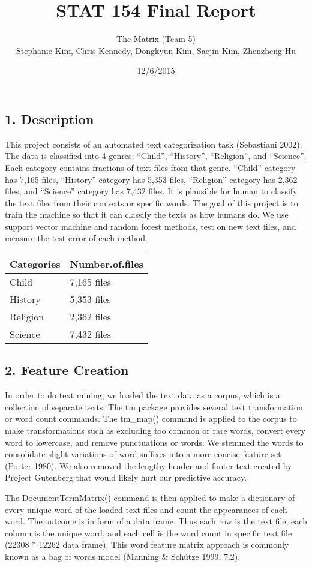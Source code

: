 \documentclass[]{article}
\title{STAT 154 Final Report}
\author{The Matrix (Team 5)\\Stephanie Kim, Chris Kennedy, Dongkyun Kim, Saejin
Kim, Zhenzheng Hu}
\date{12/6/2015}
\begin{document}
\maketitle


\subsection{{1. Description}}\label{description}

This project consists of an automated text categorization task
(Sebastiani 2002). The data is classified into 4 genres; ``Child'',
``History'', ``Religion'', and ``Science''. Each category contains
fractions of text files from that genre. ``Child'' category has 7,165
files, ``History'' category has 5,353 files, ``Religion'' category has
2,362 files, and ``Science'' category has 7,432 files. It is plausible
for human to classify the text files from their contexts or specific
words. The goal of this project is to train the machine so that it can
classify the texts as how humans do. We use support vector machine and
random forest methods, test on new text files, and measure the test
error of each method.

\begin{longtable}[c]{@{}ll@{}}
\toprule
Categories & Number.of.files\tabularnewline
\midrule
\endhead
Child & 7,165 files\tabularnewline
History & 5,353 files\tabularnewline
Religion & 2,362 files\tabularnewline
Science & 7,432 files\tabularnewline
\bottomrule
\end{longtable}

\subsection{{2. Feature Creation}}\label{feature-creation}

In order to do text mining, we loaded the text data as a corpus, which
is a collection of separate texts. The tm package provides several text
transformation or word count commands. The tm\_map() command is applied
to the corpus to make transformations such as excluding too common or
rare words, convert every word to lowercase, and remove punctuations or
words. We stemmed the words to consolidate slight variations of word
suffixes into a more concise feature set (Porter 1980). We also removed
the lengthy header and footer text created by Project Gutenberg that
would likely hurt our predictive accuracy.

The DocumentTermMatrix() command is then applied to make a dictionary of
every unique word of the loaded text files and count the appearances of
each word. The outcome is in form of a data frame. Thus each row is the
text file, each column is the unique word, and each cell is the word
count in specific text file (22308 * 12262 data frame). This word
feature matrix approach is commonly known as a bag of words model
(Manning \& Schütze 1999, 7.2).
\end{document}
